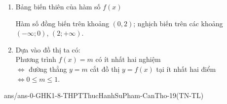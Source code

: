 \begin{bt}
{\begin{enumerate}
{
		}
	\item Bảng biến thiên của hàm số $f(x)$
	\begin{center}
	\end{center}
	Hàm số đồng biến trên khoảng $(0, 2)$; nghịch biến trên các khoảng $(-\infty; 0)$, $(2; +\infty)$.
	\item Dựa vào đồ thị ta có:\\
	Phương trình $f(x) =m$ có ít nhất hai nghiệm\\
	$\Leftrightarrow$ đường thẳng $y=m$ cắt đồ thị $y=f(x)$ tại ít nhất hai điểm\\
	$\Leftrightarrow 0\leq m\leq 1$.
	\end{enumerate}		
		
	}
\end{bt}


\begin{indapan}{10}
	{ans/ans-0-GHK1-8-THPTThucHanhSuPham-CanTho-19(TN-TL)}
\end{indapan}

